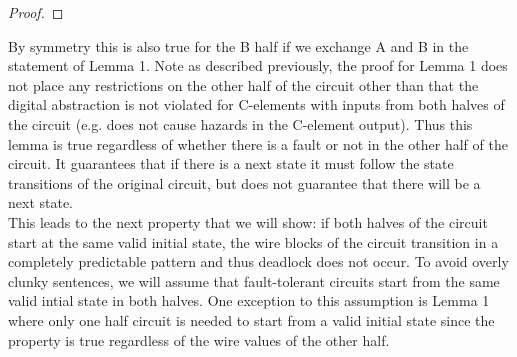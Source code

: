\documentclass[12pt]{report}
\begin{document}
\begin{proof}

\end{proof}
By symmetry this is also true for the B half if we exchange A and B in the statement of Lemma 1.  
Note as described previously, the proof for Lemma 1 does not place any restrictions on the other half of the circuit other than that the digital abstraction is not violated for C-elements with inputs from both halves of the circuit (e.g. does not cause hazards in the C-element output).  Thus this lemma is true regardless of whether there is a fault or not in the other half of the circuit.  It guarantees that if there is a next state it must follow the state transitions of the original circuit, but does not guarantee that there will be a next state.\\  %

This leads to the next property that we will show: if both halves of the circuit start at the same valid initial state, the wire blocks of the circuit transition in a completely predictable pattern and thus deadlock does not occur.
To avoid overly clunky sentences, we will assume that fault-tolerant circuits start from the same valid intial state in both halves.  One exception to this assumption is Lemma 1 where only one half circuit is needed to start from a valid initial state since the property is true regardless of the wire values of the other half.
\end{document}
